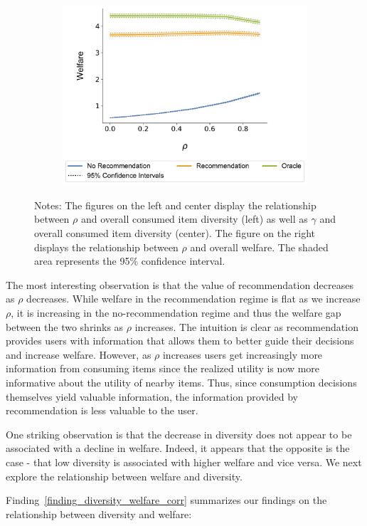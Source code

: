 \documentclass[manuscript, nonacm]{acmart}
\begin{document}
\begin{figure}[t]
\begin{subfigure}{0.3\linewidth}
  \includegraphics[width=1.0\linewidth]{figures/rho_welfare_N_200_T_20.pdf}
\end{subfigure}
\caption*{\scriptsize Notes: The figures on the left and center display the relationship between $\rho$ and overall consumed item diversity (left) as well as $\gamma$ and overall consumed item diversity (center). The figure on the right displays the relationship between $\rho$ and overall welfare. The shaded area represents the 95\% confidence interval.}
\end{figure}
\addtocounter{figure}{-1}


The most interesting observation is that the value of recommendation decreases as $\rho$ decreases. While welfare in the recommendation regime is flat as we increase $\rho$, it is increasing in the no-recommendation regime and thus the welfare gap between the two shrinks as $\rho$ increases. The intuition is clear as recommendation provides users with information that allows them to better guide their decisions and increase welfare. However, as $\rho$ increases users get increasingly more information from consuming items since the realized utility is now more informative about the utility of nearby items. Thus, since consumption decisions themselves yield valuable information, the information provided by recommendation is less valuable to the user.
\par 
One striking observation is that the decrease in diversity does not appear to be associated with a decline in welfare. Indeed, it appears that the opposite is the case - that low diversity is associated with higher welfare and vice versa. We next explore the relationship between welfare and diversity.
\par
\noindent Finding~\ref{finding_diversity_welfare_corr} summarizes our findings on the relationship between diversity and welfare:
\end{document}

